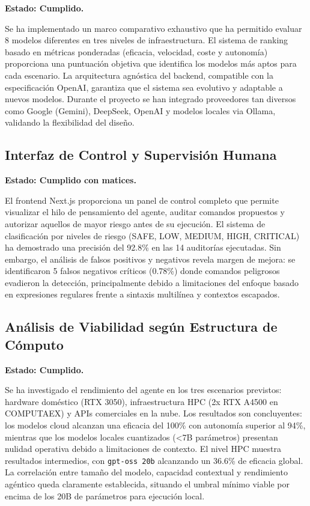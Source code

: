 \textbf{Estado: Cumplido.}

Se ha implementado un marco comparativo exhaustivo que ha permitido evaluar 8 modelos diferentes en tres niveles de infraestructura. El sistema de ranking basado en métricas ponderadas (eficacia, velocidad, coste y autonomía) proporciona una puntuación objetiva que identifica los modelos más aptos para cada escenario. La arquitectura agnóstica del backend, compatible con la especificación OpenAI, garantiza que el sistema sea evolutivo y adaptable a nuevos modelos. Durante el proyecto se han integrado proveedores tan diversos como Google (Gemini), DeepSeek, OpenAI y modelos locales via Ollama, validando la flexibilidad del diseño.

\subsection{Interfaz de Control y Supervisión Humana}

\textbf{Estado: Cumplido con matices.}

El frontend Next.js proporciona un panel de control completo que permite visualizar el hilo de pensamiento del agente, auditar comandos propuestos y autorizar aquellos de mayor riesgo antes de su ejecución. El sistema de clasificación por niveles de riesgo (SAFE, LOW, MEDIUM, HIGH, CRITICAL) ha demostrado una precisión del 92.8\% en las 14 auditorías ejecutadas. Sin embargo, el análisis de falsos positivos y negativos revela margen de mejora: se identificaron 5 falsos negativos críticos (0.78\%) donde comandos peligrosos evadieron la detección, principalmente debido a limitaciones del enfoque basado en expresiones regulares frente a sintaxis multilínea y contextos escapados.

\subsection{Análisis de Viabilidad según Estructura de Cómputo}

\textbf{Estado: Cumplido.}

Se ha investigado el rendimiento del agente en los tres escenarios previstos: hardware doméstico (RTX 3050), infraestructura HPC (2x RTX A4500 en COMPUTAEX) y APIs comerciales en la nube. Los resultados son concluyentes: los modelos cloud alcanzan una eficacia del 100\% con autonomía superior al 94\%, mientras que los modelos locales cuantizados (<7B parámetros) presentan nulidad operativa debido a limitaciones de contexto. El nivel HPC muestra resultados intermedios, con \texttt{gpt-oss 20b} alcanzando un 36.6\% de eficacia global. La correlación entre tamaño del modelo, capacidad contextual y rendimiento agéntico queda claramente establecida, situando el umbral mínimo viable por encima de los 20B de parámetros para ejecución local.

